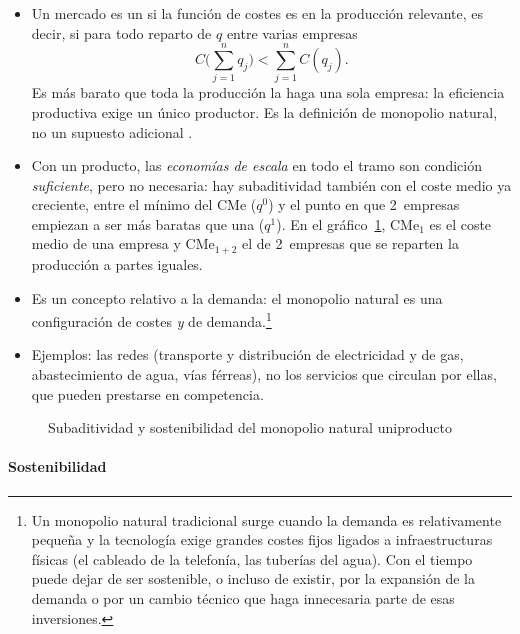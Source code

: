 \documentclass[11pt]{article}
\begin{document}
\begin{itemize}
\item Un mercado es un  si la función de costes es  en la producción relevante, es decir, si para todo reparto de $q$ entre varias empresas
  \begin{equation}
  C\Big(\sum_{j=1}^{n}q_j\Big)<\sum_{j=1}^{n}C(q_j) . \label{eq:subaditividad}
  \end{equation}
  Es más barato que toda la producción la haga una sola empresa: la eficiencia productiva exige un único productor. Es la definición de monopolio natural, no un supuesto adicional\nocite{Baumol1977Proper} .
\item Con un producto, las \emph{economías de escala} en todo el tramo son condición \emph{suficiente}, pero no necesaria: hay subaditividad también con el coste medio ya creciente, entre el mínimo del CMe ($q^0$) y el punto en que 2~empresas empiezan a ser más baratas que una ($q^1$). En el gráfico~\ref{fig:subaditividad-sostenibilidad}, $\mathrm{CMe}_1$ es el coste medio de una empresa y $\mathrm{CMe}_{1+2}$ el de 2~empresas que se reparten la producción a partes iguales.
\item Es un concepto relativo a la demanda: el monopolio natural es una configuración de costes \emph{y} de demanda.\footnote{Un monopolio natural tradicional surge cuando la demanda es relativamente pequeña y la tecnología exige grandes costes fijos ligados a infraestructuras físicas (el cableado de la telefonía, las tuberías del agua). Con el tiempo puede dejar de ser sostenible, o incluso de existir, por la expansión de la demanda o por un cambio técnico que haga innecesaria parte de esas inversiones.}
\item Ejemplos: las redes (transporte y distribución de electricidad y de gas, abastecimiento de agua, vías férreas), no los servicios que circulan por ellas, que pueden prestarse en competencia.
\end{itemize}

\begin{figure}[H]
\centering
\caption{Subaditividad y sostenibilidad del monopolio natural uniproducto}\label{fig:subaditividad-sostenibilidad}
\end{figure}

\paragraph{Sostenibilidad}
\end{document}
